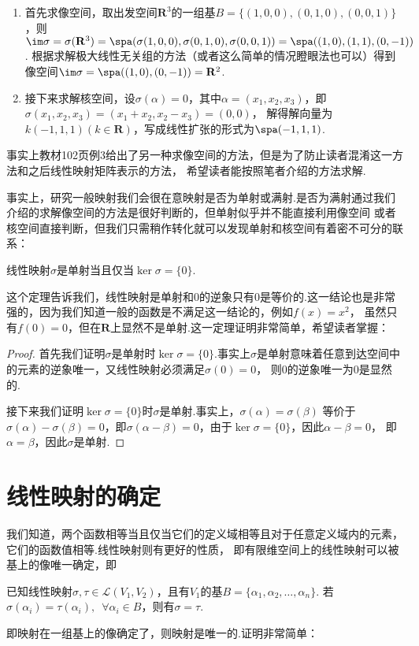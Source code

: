 \begin{solution}
\begin{enumerate}
    \item 首先求像空间，取出发空间$\mathbf{R}^3$的一组基$B=\{(1,0,0),(0,1,0),(0,0,1)\}$，则
    $\im \sigma=\sigma(\mathbf{R}^3)=\spa(\sigma(1,0,0),\sigma(0,1,0),\sigma(0,0,1))=\spa((1,0),(1,1),(0,-1))$.
    根据求解极大线性无关组的方法（或者这么简单的情况瞪眼法也可以）得到像空间$\im \sigma=\spa((1,0),(0,-1))=\mathbf{R}^2$.
    \item 接下来求解核空间，设$\sigma(\alpha)=0$，其中$\alpha=(x_1,x_2,x_3)$，即$\sigma(x_1,x_2,x_3)=(x_1+x_2,x_2-x_3)=(0,0)$，
    解得解向量为$k(-1,1,1)(k\in\mathbf{R})$，写成线性扩张的形式为$\spa(-1,1,1)$.
\end{enumerate}
\end{solution}

事实上教材102页例3给出了另一种求像空间的方法，但是为了防止读者混淆这一方法和之后线性映射矩阵表示的方法，
希望读者能按照笔者介绍的方法求解.

事实上，研究一般映射我们会很在意映射是否为单射或满射.是否为满射通过我们介绍的求解像空间的方法是很好判断的，但单射似乎并不能直接利用像空间
或者核空间直接判断，但我们只需稍作转化就可以发现单射和核空间有着密不可分的联系：
\begin{theorem}\label{thm:5:单射与核空间}
    线性映射$\sigma$是单射当且仅当$\ker \sigma=\{0\}$.
\end{theorem}
这个定理告诉我们，线性映射是单射和0的逆象只有0是等价的.这一结论也是非常强的，因为我们知道一般的函数是不满足这一结论的，例如$f(x)=x^2$，
虽然只有$f(0)=0$，但在$\mathbf{R}$上显然不是单射.这一定理证明非常简单，希望读者掌握：

\begin{proof}
    首先我们证明$\sigma$是单射时$\ker\sigma=\{0\}$.事实上$\sigma$是单射意味着任意到达空间中的元素的逆象唯一，又线性映射必须满足$\sigma(0)=0$，
    则0的逆象唯一为0是显然的.

    接下来我们证明$\ker \sigma=\{0\}$时$\sigma$是单射.事实上，$\sigma(\alpha)=\sigma(\beta)$
    等价于$\sigma(\alpha)-\sigma(\beta)=0$，即$\sigma(\alpha-\beta)=0$，由于$\ker \sigma=\{0\}$，因此$\alpha-\beta=0$，
    即$\alpha=\beta$，因此$\sigma$是单射.
\end{proof}

\section{线性映射的确定}
我们知道，两个函数相等当且仅当它们的定义域相等且对于任意定义域内的元素，它们的函数值相等.线性映射则有更好的性质，
即有限维空间上的线性映射可以被基上的像唯一确定，即
\begin{theorem}\label{thm:5:线性映射唯一确定}
    已知线性映射$\sigma,\tau\in \mathcal{L}(V_1,V_2)$，且有$V_1$的基$B=\{\alpha_1,\alpha_2,\ldots,\alpha_n\}$.
    若$\sigma(\alpha_i)=\tau(\alpha_i),\enspace\forall \alpha_i \in B$，则有$\sigma=\tau$.
\end{theorem}
即映射在一组基上的像确定了，则映射是唯一的.证明非常简单：

